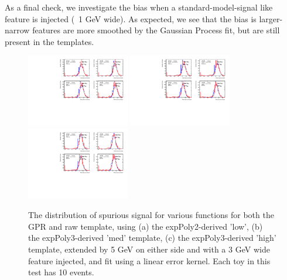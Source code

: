 As a final check, we investigate the bias when a standard-model-signal like feature is injected (~1 GeV wide). As expected, we see that the bias is larger- narrow features are more smoothed by the Gaussian Process fit, but are still present in the templates.

\begin{figure} 
\begin{center}
  \includegraphics[width=0.4\textwidth]{figures/background/gpr/validation/linear/ToyTest_FitSigVals_lowpT_10_Sig_1s}   
  \includegraphics[width=0.4\textwidth]{figures/background/gpr/validation/linear/ToyTest_FitSigVals_medpT_10_Sig_1s}   
  \includegraphics[width=0.4\textwidth]{figures/background/gpr/validation/linear/ToyTest_FitSigVals_highpT_10_Sig_1s}   
\caption{The distribution of spurious signal for various functions for both the GPR and raw template, using (a) the expPoly2-derived 'low', (b) the expPoly3-derived 'med' template, (c) the expPoly3-derived 'high' template, extended by 5 GeV on either side and with a 3 GeV wide feature injected, and fit using a linear error kernel. Each toy in this test has 10 events.}
\label{fig:linearkernel_lowpt_10_Sig_1s}
\end{center}
\end{figure}

